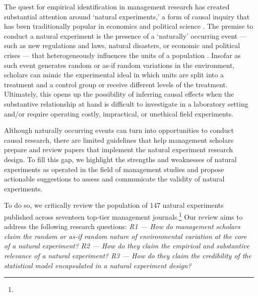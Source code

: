 
The quest for empirical identification in management research has created
substantial attention around `natural experiments,' a form of causal inquiry
that has been traditionally popular in economics
\parencite[][]{Meyer1995,Rosenzweig2000} and political science
\parencite[][]{Dunning2008}.  The premise to conduct a natural experiment is the
presence of a `naturally' occurring event --- such as new regulations and laws,
natural disasters, or economic and political crises --- that heterogeneously
influences the units of a population \parencite[][]{Dunning2012,Robinson2009}.
Insofar as such event generates random or as-if random variations in the
environment, scholars can mimic the experimental ideal in which units are split
into a treatment and a control group or receive different levels of the
treatment. Ultimately, this opens up the possibility of inferring causal effects
when the substantive relationship at hand is difficult to investigate in a
laboratory setting and/or require operating costly, impractical, or unethical
field experiments.


Although naturally occurring events can turn into opportunities to conduct
causal research, there are limited guidelines that help management scholars
prepare and review papers that implement the natural experiment research design.
To fill this gap, we highlight the strengths and weaknesses of natural
experiments as operated in the field of management studies and propose
actionable suggestions to assess and communicate the validity of natural
experiments.

To do so, we critically review the population of 147 natural experiments
published across seventeen top-tier management journals.\footnote{} Our review aims
to address the following research questions: \emph{R1 --- How do management
scholars claim the random or as-if random nature of environmental variation at
the core of a natural experiment? R2 --- How do they claim the empirical and
substantive relevance of a natural experiment? R3 --- How do they claim the
credibility of the statistical model encapsulated in a natural experiment
design?}

